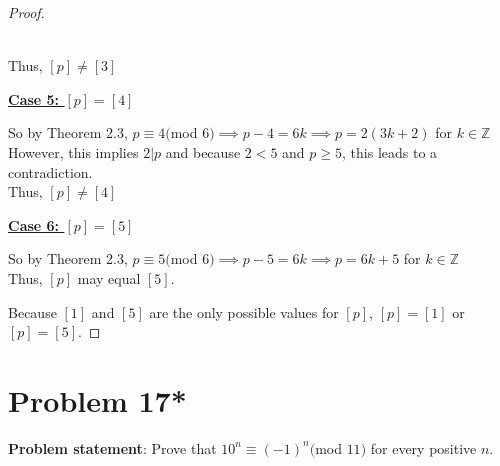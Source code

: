 \documentclass{article} %
\begin{document}
\begin{addmargin}[1em]{0em}
\begin{proof}
\begin{addmargin}[1em]{0em}
\\Thus, $[p] \neq [3]$
\end{addmargin}
\underline{\textbf{Case 5: $[p] = [4]$}}
\begin{addmargin}[1em]{0em}
So by Theorem 2.3, $p \equiv 4($mod $6) \implies p - 4 = 6k \implies p = 2(3k + 2)$ for $k \in \mathbb{Z}$
\\However, this implies $2|p$ and because $2 < 5$ and $p \geq 5$, this leads to a contradiction.
\\Thus, $[p] \neq [4]$
\end{addmargin}
\underline{\textbf{Case 6: $[p] = [5]$}}
\begin{addmargin}[1em]{0em}
So by Theorem 2.3, $p \equiv 5($mod $6) \implies p - 5 = 6k \implies p = 6k + 5$ for $k \in \mathbb{Z}$
\\Thus, $[p]$ may equal $[5]$.
\end{addmargin}
Because $[1]$ and $[5]$ are the only possible values for $[p]$, $[p] = [1]$ or $[p] = [5]$.
\end{proof}
\end{addmargin}

\newpage

\section*{Problem 17*}


\textbf{Problem statement}: Prove that $10^n \equiv (-1)^n($mod $ 11)$ for every positive $n$.
\\
\end{document}
